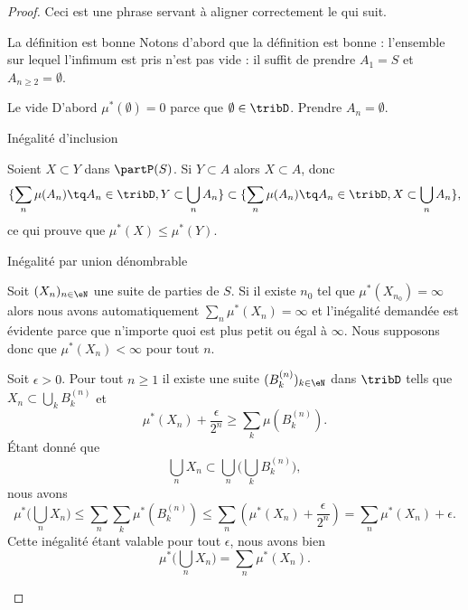 \begin{proof}
    Ceci est une phrase servant à aligner correctement le  qui suit.
    \begin{subproof}
    \item[La définition est bonne]
    Notons d'abord que la définition est bonne : l'ensemble sur lequel l'infimum est pris n'est pas vide : il suffit de prendre \( A_1=S\) et \( A_{n\geq 2}=\emptyset\).
    \item[Le vide]
        D'abord \( \mu^*(\emptyset)=0\) parce que \( \emptyset\in\tribD\). Prendre \( A_n=\emptyset\).
    \item[Inégalité d'inclusion]

        Soient \( X\subset Y\) dans \( \partP(S)\). Si \( Y\subset A\) alors \( X\subset A\), donc
        \begin{equation}
            \{ \sum_n\mu(A_n)\tq A_n\in\tribD,Y\subset\bigcup_nA_n \} \subset\{ \sum_n\mu(A_n)\tq A_n\in\tribD,X\subset\bigcup_nA_n \} ,
        \end{equation}
        ce qui prouve que \( \mu^*(X)\leq \mu^*(Y)\).
    \item[Inégalité par union dénombrable]

        Soit \( (X_n)_{n\in \eN}\) une suite de parties de \( S\). Si il existe \( n_0\) tel que \( \mu^*(X_{n_0})=\infty\) alors nous avons automatiquement \( \sum_n\mu^*(X_n)=\infty\) et l'inégalité demandée est évidente parce que n'importe quoi est plus petit ou égal à \( \infty\). Nous supposons donc que \( \mu^*(X_n)<\infty\) pour tout \( n\).

        Soit \( \epsilon>0\). Pour tout \( n\geq 1\) il existe une suite \( (B_k^{(n)})_{k\in \eN}\) dans \( \tribD\) tells que \( X_n\subset\bigcup_kB_k^{(n)}\) et
        \begin{equation}
            \mu^*(X_n)+\frac{ \epsilon }{ 2^n }\geq \sum_k\mu(B_k^{(n)}).
        \end{equation}
        Étant donné que
        \begin{equation}
            \bigcup_nX_n\subset\bigcup_n\big( \bigcup_kB_k^{(n)} \big),
        \end{equation}
        nous avons
        \begin{equation}
            \mu^*\big( \bigcup_nX_n \big)\leq \sum_n\sum_k\mu^*(B_k^{(n)})\leq \sum_n\left( \mu^*(X_n)+\frac{ \epsilon }{ 2^n } \right)=\sum_n\mu^*(X_n)+\epsilon.
        \end{equation}
        Cette inégalité étant valable pour tout \( \epsilon\), nous avons bien
        \begin{equation}
            \mu^*\big( \bigcup_nX_n \big)=\sum_n\mu^*(X_n).
        \end{equation}


\end{subproof}
\end{proof}
